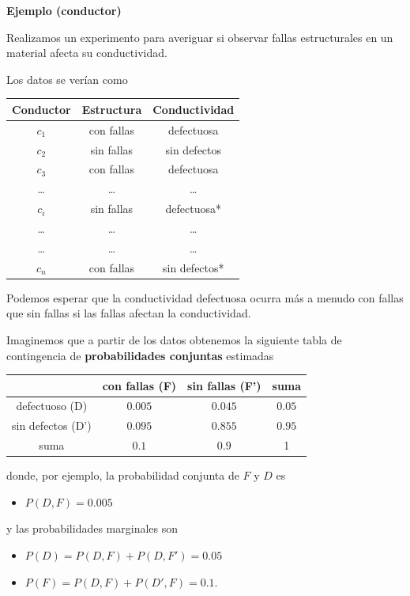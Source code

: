 \documentclass[
]{book}
\providecommand{\tightlist}{%
  \setlength{\itemsep}{0pt}\setlength{\parskip}{0pt}}
\begin{document}
\textbf{Ejemplo (conductor)}

Realizamos un experimento para averiguar si observar fallas estructurales en un material afecta su conductividad.

Los datos se verían como

\begin{longtable}[]{@{}ccc@{}}
\toprule\noalign{}
Conductor & Estructura & Conductividad \\
\midrule\noalign{}
\endhead
\bottomrule\noalign{}
\endlastfoot
\(c_1\) & con fallas & defectuosa \\
\(c_2\) & sin fallas & sin defectos \\
\(c_3\) & con fallas & defectuosa \\
\ldots{} & \ldots{} & \ldots{} \\
\(c_i\) & sin fallas & defectuosa* \\
\ldots{} & \ldots{} & \ldots{} \\
\ldots{} & \ldots{} & \ldots{} \\
\(c_n\) & con fallas & sin defectos* \\
\end{longtable}

Podemos esperar que la conductividad defectuosa ocurra más a menudo con fallas que sin fallas si las fallas afectan la conductividad.

Imaginemos que a partir de los datos obtenemos la siguiente tabla de contingencia de \textbf{probabilidades conjuntas} estimadas

\begin{longtable}[]{@{}cccc@{}}
\toprule\noalign{}
& con fallas (F) & sin fallas (F') & suma \\
\midrule\noalign{}
\endhead
\bottomrule\noalign{}
\endlastfoot
defectuoso (D) & \(0.005\) & \(0.045\) & \(0.05\) \\
sin defectos (D') & \(0.095\) & \(0.855\) & \(0.95\) \\
suma & \(0.1\) & \(0.9\) & 1 \\
\end{longtable}

donde, por ejemplo, la probabilidad conjunta de \(F\) y \(D\) es

\begin{itemize}
\tightlist
\item
  \(P(D,F)=0.005\)
\end{itemize}

y las probabilidades marginales son

\begin{itemize}
\tightlist
\item
  \(P(D)=P(D, F) + P(D, F')=0.05\)
\item
  \(P(F)=P(D, F) + P(D', F)= 0.1\).
\end{itemize}
\end{document}
